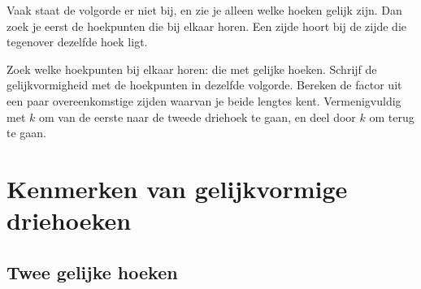 Vaak staat de volgorde er niet bij, en zie je alleen welke hoeken gelijk zijn. Dan zoek je eerst de hoekpunten die bij elkaar horen. Een zijde hoort bij de zijde die tegenover dezelfde hoek ligt.


\begin{werkwijze}
Zoek welke hoekpunten bij elkaar horen: die met gelijke hoeken. Schrijf de gelijkvormigheid met de hoekpunten in dezelfde volgorde. Bereken de factor uit een paar overeenkomstige zijden waarvan je beide lengtes kent. Vermenigvuldig met $k$ om van de eerste naar de tweede driehoek te gaan, en deel door $k$ om terug te gaan.
\end{werkwijze}


\begin{oefeningen}
\end{oefeningen}

\section{Kenmerken van gelijkvormige driehoeken}

\subsection{Twee gelijke hoeken}

